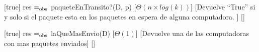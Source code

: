 \begin{Interfaz}
  [true]%
  {res $=_{\mathrm{obs}}$ paqueteEnTransito?(D, p)}%
  [$\Theta(n \times log(k))$]%
  [Devuelve ``True'' si y solo si el paquete esta en los paquetes en espera de alguna computadora. ]%
  []%

  [true]%
  {res $=_{\mathrm{obs}}$ laQueMasEnvio(D)}%
  [$\Theta(1)$]%
  [Devuelve una de las computadoras con mas paquetes enviados]%
  []%


\end{Interfaz}

